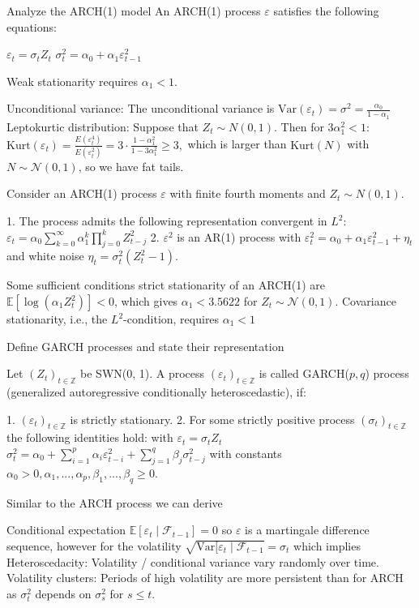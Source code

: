 Analyze the ARCH(1) model
An ARCH(1) process \(\varepsilon\) satisfies the following equations:

\(\varepsilon_t = \sigma_t Z_t\)
\(\sigma_t^2 = \alpha_0 + \alpha_1 \varepsilon_{t - 1}^2\)

Weak stationarity requires \(\alpha_1 < 1\).

Unconditional variance: The unconditional variance is
\(\text{Var}(\varepsilon_t) = \sigma^2 = \frac{\alpha_0}{1 - \alpha_1}\)
Leptokurtic distribution: Suppose that \(Z_t \sim N(0, 1)\). Then for \(3 \alpha_1^2 < 1\):
\(\text{Kurt}(\varepsilon_t) = \frac{E(\varepsilon_t^4)}{E(\varepsilon_t^2)} = 3 \cdot \frac{1 - \alpha_1^2}{1 - 3 \alpha_1^2} \ge 3,\)
which is larger than \( \text{Kurt}(N) \) with \( N \sim \mathcal{N}(0, 1) \), so we have fat tails.


Consider an ARCH(1) process \(\varepsilon\) with finite fourth moments and \(Z_t \sim N(0, 1)\).

1. The process admits the following representation convergent in \(L^2\):
\(\varepsilon_t = \alpha_0 \sum_{k = 0}^\infty \alpha_1^k \prod_{j = 0}^k Z_{t - j}^2\)
2. \(\varepsilon^2\) is an AR(1) process with
\(\varepsilon_t^2 = \alpha_0 + \alpha_1 \varepsilon_{t - 1}^2 + \eta_t\)
and white noise \(\eta_t = \sigma_t^2 (Z_t^2 - 1)\).

Some sufficient conditions strict stationarity of an ARCH(1) are
\( \mathbb{E}[\log(α_1 Z_t^2 )]< 0\), which gives
\( α_1 < 3.5622 \) for \( Z_t \sim \mathcal{N}(0, 1) \).
Covariance stationarity, i.e., the \( L^2 \)-condition, requires \( \alpha_1 < 1\)


Define GARCH processes and state their representation


Let \((Z_t)_{t \in \mathbb{Z}}\) be SWN(0, 1). 
A process \((\varepsilon_t)_{t \in \mathbb{Z}}\) is called GARCH(\(p, q\)) process 
(generalized autoregressive conditionally heteroscedastic), if:

1. \((\varepsilon_t)_{t \in \mathbb{Z}}\) is strictly stationary.
2. For some strictly positive process \((\sigma_t)_{t \in \mathbb{Z}}\) the following identities hold:
with
\(\varepsilon_t = \sigma_t Z_t\)
\(\sigma_t^2 = \alpha_0 + \sum_{i = 1}^p \alpha_i \varepsilon_{t - i}^2 + \sum_{j = 1}^q \beta_j \sigma_{t - j}^2\)
with constants \(\alpha_0 > 0, \alpha_1, ..., \alpha_p, \beta_1, ..., \beta_q \ge 0\).

Similar to the ARCH process we can derive

Conditional expectation \( \mathbb{E}[\varepsilon_t\mid \mathcal{F}_{t-1}] = 0 \)
so \( \varepsilon \) is a martingale difference sequence,
however for the volatility
\( \sqrt{\text{Var}[\varepsilon_t \mid \mathcal{F}_{t-1}} = \sigma_t \)
which implies
Heteroscedacity: Volatility / conditional variance vary randomly over time.
Volatility clusters: Periods of high volatility are more persistent than for ARCH as \( \sigma^2_t \) 
depends on \( \sigma^2_s \) for \( s \leq t \).


